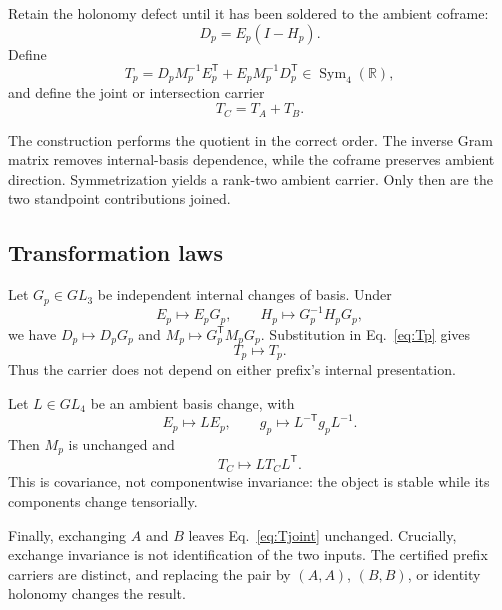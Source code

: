 \documentclass[11pt]{article}
\theoremstyle{definition}
\theoremstyle{remark}
\newcommand{\Sym}{\operatorname{Sym}}
\begin{document}
Retain the holonomy defect until it has been soldered to the ambient coframe:
\begin{equation}\label{eq:defect}
 D_p=E_p(I-H_p).
\end{equation}
Define
\begin{equation}\label{eq:Tp}
 T_p=D_pM_p^{-1}E_p^{\mathsf T}
     +E_pM_p^{-1}D_p^{\mathsf T}\in\Sym_4(\mathbb R),
\end{equation}
and define the joint or intersection carrier
\begin{equation}\label{eq:Tjoint}
 T_C=T_A+T_B.
\end{equation}

The construction performs the quotient in the correct order. The inverse Gram matrix removes internal-basis dependence, while the coframe preserves ambient direction. Symmetrization yields a rank-two ambient carrier. Only then are the two standpoint contributions joined.

\subsection{Transformation laws}

Let $G_p\in GL_3$ be independent internal changes of basis. Under
\begin{equation}\label{eq:internalgauge}
 E_p\mapsto E_pG_p,\qquad
 H_p\mapsto G_p^{-1}H_pG_p,
\end{equation}
we have $D_p\mapsto D_pG_p$ and $M_p\mapsto G_p^{\mathsf T}M_pG_p$. Substitution in Eq.~\eqref{eq:Tp} gives
\begin{equation}\label{eq:gaugeinvariance}
 T_p\mapsto T_p.
\end{equation}
Thus the carrier does not depend on either prefix's internal presentation.

Let $L\in GL_4$ be an ambient basis change, with
\begin{equation}
 E_p\mapsto LE_p,\qquad g_p\mapsto L^{-\mathsf T}g_pL^{-1}.
\end{equation}
Then $M_p$ is unchanged and
\begin{equation}\label{eq:ambientcovariance}
 T_C\mapsto LT_CL^{\mathsf T}.
\end{equation}
This is covariance, not componentwise invariance: the object is stable while its components change tensorially.

Finally, exchanging $A$ and $B$ leaves Eq.~\eqref{eq:Tjoint} unchanged. Crucially, exchange invariance is not identification of the two inputs. The certified prefix carriers are distinct, and replacing the pair by $(A,A)$, $(B,B)$, or identity holonomy changes the result.
\end{document}
